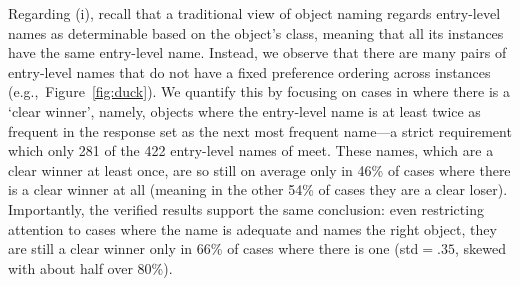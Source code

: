 Regarding (i), recall that a traditional view of object naming regards entry-level names as determinable based on the object's class, meaning that all its instances have the same entry-level name. 
Instead, we observe that there are many pairs of entry-level names that do not have a fixed preference ordering across instances (e.g.,~Figure~\ref{fig:duck}). 
We quantify this by focusing on cases in \mn where there is a `clear winner', namely, objects where the entry-level name is at least twice as frequent in the response set as the next most frequent name---a strict requirement which only 281 of the 422 entry-level names of \mn meet.
These names, which are a clear winner at least once, are so still on average only in 46\% of cases where there is a clear winner at all (meaning in the other 54\% of cases they are a clear loser).
Importantly, the verified results support the same conclusion: 
even restricting attention to cases where the name is adequate and names the right object, they are still a clear winner only in 66\% of cases where there is one (std\mbox{$=.35$}, skewed with about half over 80\%).


